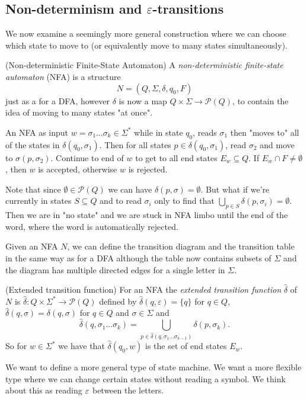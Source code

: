 \documentclass[tikx, border = 10pt]{article}
\begin{document}
\subsection{Non-determinism and $ \varepsilon $-transitions}
We now examine a seemingly more general construction where we can choose which state to move to (or equivalently move to many states simultaneously).
\begin{definition}
	(Non-deterministic Finite-State Automaton) A \textit{non-deterministic finite-state automaton} (NFA) is a structure
	\[
	  N = (Q, \Sigma, \delta, q_0, F)
	\]
	just as a for a DFA, however $ \delta $ is now a map $ Q\times \Sigma \to \mathcal P(Q) $, to contain the idea of moving to many states "at once".
\end{definition}
An NFA as input $ w= \sigma_1\dots \sigma_k \in \Sigma^* $ while in state $ q_0 $, reads $ \sigma_1 $ then "moves to" all of the states in $ \delta(q_0,\sigma_1) $. Then for all states $ p\in \delta(q_0,\sigma_1) $, read $ \sigma_2 $ and move to $ \sigma(p,\sigma_2) $. Continue to end of $ w $ to get to all end states $ E_w\subseteq Q $. If $ E_w\cap F \ne \emptyset $, then $ w $ is accepted, otherwise $ w $ is rejected.
\begin{remark}
	Note that since $ \emptyset \in\mathcal P(Q) $ we can have $ \delta(p, \sigma) = \emptyset $. But what if we're currently in states $ S\subseteq Q $ and to read $ \sigma_i $ only to find that $ \bigcup_{p\in S} \delta(p,\sigma_i) = \emptyset $. Then we are in "no state" and we are stuck in NFA limbo until the end of the word, where the word is automatically rejected.
\end{remark}
Given an NFA $ N $, we can define the transition diagram and the transition table in the same way as for a DFA although the table now contains subsets of $ \Sigma $ and the diagram has multiple directed edges for a single letter in $ \Sigma $.
\begin{definition}
	(Extended transition function) For an NFA the \textit{extended transition function} $ \hat\delta $ of $ N $ is $ \hat\delta : Q \times \Sigma^* \to \mathcal P(Q) $ defined by $ \hat\delta(q,\varepsilon) = \{q\} $ for $ q\in Q $, $ \hat\delta(q,\sigma) = \delta(q, \sigma) $ for $ q\in Q $ and $ \sigma\in \Sigma $ and
	\[
		\hat\delta(q,\sigma_1\dots\sigma_k) = \bigcup_{p\in \hat\delta(q, \sigma_1\dots \sigma_{k-1})}\delta(p,\sigma_k).
	\]
	So for $ w\in \Sigma^* $ we have that $ \hat\delta(q_0,w) $ is the set of end states $ E_w $.
\end{definition}
We want to define a more general type of state machine. We want a more flexible type where we can change certain states without reading a symbol. We think about this as reading $ \varepsilon $ between the letters.
\end{document}
